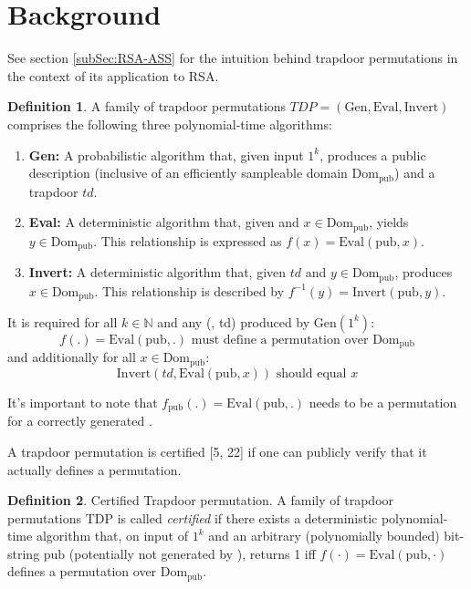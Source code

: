 \documentclass[]{final_report}
\theoremstyle{definition}
\newtheorem{definition}{Definition}[chapter]
\begin{document}
\section{Background}
See section \ref{subSec:RSA-ASS} for the intuition behind trapdoor permutations in the context of its application to RSA.
\begin{definition}
\label{def:TDP}
A family of trapdoor permutations \( TDP = (\text{Gen}, \text{Eval}, \text{Invert}) \) comprises the following three polynomial-time algorithms:
\begin{enumerate}
    \item \textbf{Gen:} A probabilistic algorithm that, given input \( 1^k \), produces a public description  (inclusive of an efficiently sampleable domain \( \text{Dom}_{\text{pub}} \)) and a trapdoor \( td \).
    
    \item \textbf{Eval:} A deterministic algorithm that, given  and \( x \in \text{Dom}_{\text{pub}} \), yields \( y \in \text{Dom}_{\text{pub}} \). This relationship is expressed as \( f(x) = \text{Eval}(\text{pub}, x) \).
    
    \item \textbf{Invert:} A deterministic algorithm that, given \( td \) and \( y \in \text{Dom}_{\text{pub}} \), produces \( x \in \text{Dom}_{\text{pub}} \). This relationship is described by \( f^{-1}(y) = \text{Invert}(\text{pub}, y) \).
\end{enumerate}

It is required for all \( k \in \mathbb{N} \) and any (, td) produced by \(\text{Gen}(1^k)\):
\[ f(.) = \text{Eval}(\text{pub}, .) \text{ must define a permutation over } \text{Dom}_{\text{pub}} \]
and additionally for all \( x \in \text{Dom}_{\text{pub}} \):
\[ \text{Invert}(td, \text{Eval}(\text{pub}, x)) \text{ should equal } x \]

It's important to note that \( f_{\text{pub}}(.) = \text{Eval}(\text{pub}, .) \) needs to be a permutation for a correctly generated . 
\end{definition}

A trapdoor permutation is certified [5, 22] if one can publicly verify that it actually defines a permutation. 

\begin{definition} Certified Trapdoor permutation.
\label{def:CTDP}
A family of trapdoor permutations \( \text{TDP} \) is called \textit{certified} if there exists a deterministic polynomial-time algorithm  that, on input of \( 1^k \) and an arbitrary (polynomially bounded) bit-string \( \text{pub} \) (potentially not generated by ), returns 1 iff \( f(\cdot) = \text{Eval}(\text{pub}, \cdot) \) defines a permutation over \( \text{Dom}_{\text{pub}} \).
\end{definition}
\end{document}
